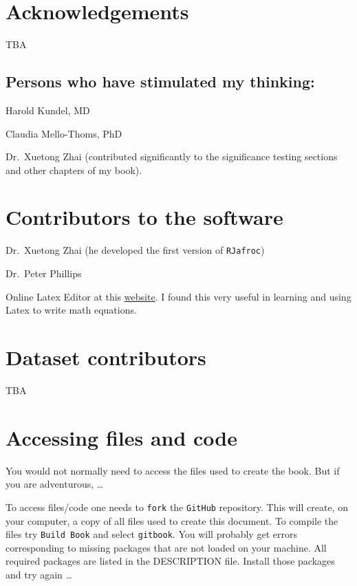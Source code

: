 \documentclass[
]{book}
\begin{document}
\hypertarget{quick-start-index-acknowledgements}{%
\section{Acknowledgements}\label{quick-start-index-acknowledgements}}

TBA

\hypertarget{persons-who-have-stimulated-my-thinking}{%
\subsection{Persons who have stimulated my thinking:}\label{persons-who-have-stimulated-my-thinking}}

Harold Kundel, MD

Claudia Mello-Thoms, PhD

Dr.~Xuetong Zhai (contributed significantly to the significance testing sections and other chapters of my book).

\hypertarget{quick-start-index-contributors}{%
\section{Contributors to the software}\label{quick-start-index-contributors}}

Dr.~Xuetong Zhai (he developed the first version of \texttt{RJafroc})

Dr.~Peter Phillips

Online Latex Editor at this \href{https://latexeditor.lagrida.com/}{website}. I found this very useful in learning and using Latex to write math equations.

\hypertarget{quick-start-index-dataset-contributors}{%
\section{Dataset contributors}\label{quick-start-index-dataset-contributors}}

TBA

\hypertarget{quick-start-index-how-to-access-files}{%
\section{Accessing files and code}\label{quick-start-index-how-to-access-files}}

You would not normally need to access the files used to create the book. But if you are adventurous, \ldots{}

To access files/code one needs to \texttt{fork} the \texttt{GitHub} repository. This will create, on your computer, a copy of all files used to create this document. To compile the files try \texttt{Build\ Book} and select \texttt{gitbook}. You will probably get errors corresponding to missing packages that are not loaded on your machine. All required packages are listed in the DESCRIPTION file. Install those packages and try again \ldots{}
\end{document}
